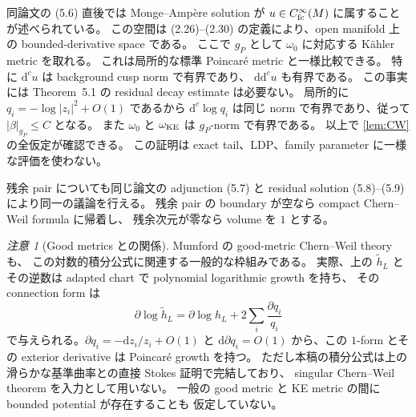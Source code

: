 \documentclass[11pt,a4paper]{ltjsarticle}
\newcommand{\dd}{\mathrm d}
\theoremstyle{plain}
\theoremstyle{definition}
\theoremstyle{remark}
\newtheorem{remark}[remark]{注意}
\begin{document}
同論文の (5.6) 直後では Monge--Amp\`ere solution が
$u\in C^\infty_{\rm fc}(M)$ に属することが述べられている。
この空間は (2.26)--(2.30) の定義により、open manifold 上の
bounded-derivative space である。
ここで $g_P$ として $\omega_0$ に対応する K\"ahler metric を取れる。
これは局所的な標準 Poincar\'e metric と一様比較できる。
特に $\dd^cu$ は background cusp norm で有界であり、
$\dd\dd^cu$ も有界である。
この事実には Theorem~5.1 の residual decay estimate は必要ない。
局所的に $q_i=-\log|z_i|^2+O(1)$ であるから
$\dd^c\log q_i$ は同じ norm で有界であり、従って $|\beta|_{g_P}\le C$ となる。
また $\omega_0$ と $\omega_{\rm KE}$ は $g_P$-norm で有界である。
以上で \cref{lem:CW} の全仮定が確認できる。
この証明は exact tail、LDP、family parameter に一様な評価を使わない。

残余 pair についても同じ論文の adjunction (5.7) と
residual solution (5.8)--(5.9) により同一の議論を行える。
残余 pair の boundary が空なら compact Chern--Weil formula に帰着し、
残余次元が零なら volume を $1$ とする。

\begin{remark}[Good metrics との関係]
Mumford \cite[\S1, Theorem~1.4]{Mumford} の good-metric Chern--Weil theory も、
この対数的積分公式に関連する一般的な枠組みである。
実際、上の $\widetilde h_L$ とその逆数は adapted chart で
polynomial logarithmic growth を持ち、
その connection form は
\[
 \partial\log\widetilde h_L
 =\partial\log h_L+2\sum_i\frac{\partial q_i}{q_i}
\]
で与えられる。$\partial q_i=-\dd z_i/z_i+O(1)$ と
$\dd\partial q_i=O(1)$ から、この $1$-form とその exterior derivative は
Poincar\'e growth を持つ。
ただし本稿の積分公式は上の滑らかな基準曲率との直接 Stokes 証明で完結しており、
singular Chern--Weil theorem を入力として用いない。
一般の good metric と KE metric の間に bounded potential が存在することも
仮定していない。
\end{remark}
\end{document}
